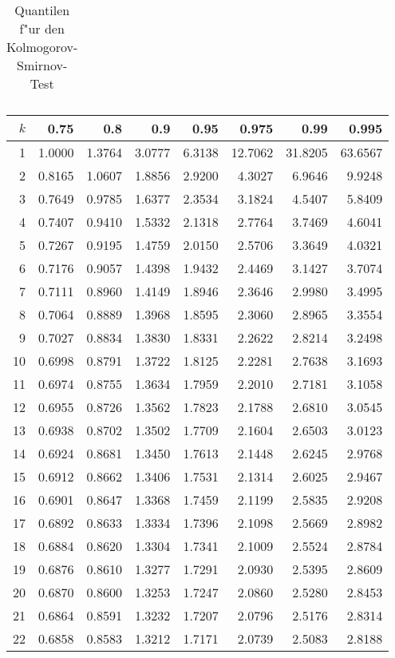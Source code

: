 \begin{table}[h]
\begin{center}
\begin{tabular}{|r|rrr|rrr|rrr|}
\hline
\end{tabular}
\end{center}
\caption{Quantilen f"ur den Kolmogorov-Smirnov-Test\label{KS-tabelle}
}
\end{table}

\begin{table}[h]
\begin{center}
\begin{tabular}{|r|rrrrrrr|}
\hline
$k$&0.75&0.8&0.9&0.95&0.975&0.99&0.995\\
\hline
1&1.0000&1.3764&3.0777&6.3138&12.7062&31.8205&63.6567\\
2&0.8165&1.0607&1.8856&2.9200&4.3027&6.9646&9.9248\\
3&0.7649&0.9785&1.6377&2.3534&3.1824&4.5407&5.8409\\
4&0.7407&0.9410&1.5332&2.1318&2.7764&3.7469&4.6041\\
5&0.7267&0.9195&1.4759&2.0150&2.5706&3.3649&4.0321\\
6&0.7176&0.9057&1.4398&1.9432&2.4469&3.1427&3.7074\\
7&0.7111&0.8960&1.4149&1.8946&2.3646&2.9980&3.4995\\
8&0.7064&0.8889&1.3968&1.8595&2.3060&2.8965&3.3554\\
9&0.7027&0.8834&1.3830&1.8331&2.2622&2.8214&3.2498\\
10&0.6998&0.8791&1.3722&1.8125&2.2281&2.7638&3.1693\\
11&0.6974&0.8755&1.3634&1.7959&2.2010&2.7181&3.1058\\
12&0.6955&0.8726&1.3562&1.7823&2.1788&2.6810&3.0545\\
13&0.6938&0.8702&1.3502&1.7709&2.1604&2.6503&3.0123\\
14&0.6924&0.8681&1.3450&1.7613&2.1448&2.6245&2.9768\\
15&0.6912&0.8662&1.3406&1.7531&2.1314&2.6025&2.9467\\
16&0.6901&0.8647&1.3368&1.7459&2.1199&2.5835&2.9208\\
17&0.6892&0.8633&1.3334&1.7396&2.1098&2.5669&2.8982\\
18&0.6884&0.8620&1.3304&1.7341&2.1009&2.5524&2.8784\\
19&0.6876&0.8610&1.3277&1.7291&2.0930&2.5395&2.8609\\
20&0.6870&0.8600&1.3253&1.7247&2.0860&2.5280&2.8453\\
21&0.6864&0.8591&1.3232&1.7207&2.0796&2.5176&2.8314\\
22&0.6858&0.8583&1.3212&1.7171&2.0739&2.5083&2.8188\\

\end{tabular}
\end{center}
\end{table}
